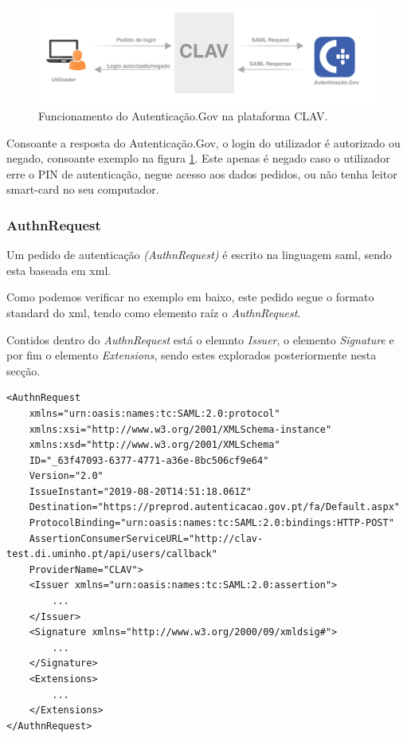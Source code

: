 \vspace{-3mm}
\begin{figure}[h]
    \centering
    \includegraphics[width=\textwidth]{img/saml/clavflow.png}
    \caption{Funcionamento do Autenticação.Gov na plataforma CLAV.}
    \label{clavflow}
\end{figure}

Consoante a resposta do Autenticação.Gov, o login do utilizador é autorizado ou negado, consoante exemplo na figura \ref{clavflow}.
Este apenas é negado caso o utilizador erre o PIN de autenticação, negue acesso aos dados pedidos, ou não tenha leitor smart-card no seu computador.

\cleardoublepage
\subsubsection{AuthnRequest} \label{authnRequestSection}

Um pedido de autenticação \emph{(AuthnRequest)} é escrito na linguagem \gls{saml}, sendo esta baseada em \gls{xml}.

Como podemos verificar no exemplo em baixo, este pedido segue o formato standard do \gls{xml}, tendo como elemento raíz o \emph{AuthnRequest}.

Contidos dentro do \emph{AuthnRequest} está o elemnto \emph{Issuer}, o elemento \emph{Signature} e por fim o elemento \emph{Extensions}, sendo estes explorados posteriormente nesta secção.

\begin{lstlisting}
<AuthnRequest 
    xmlns="urn:oasis:names:tc:SAML:2.0:protocol"
    xmlns:xsi="http://www.w3.org/2001/XMLSchema-instance"
    xmlns:xsd="http://www.w3.org/2001/XMLSchema"
    ID="_63f47093-6377-4771-a36e-8bc506cf9e64"
    Version="2.0"
    IssueInstant="2019-08-20T14:51:18.061Z"
    Destination="https://preprod.autenticacao.gov.pt/fa/Default.aspx"
    ProtocolBinding="urn:oasis:names:tc:SAML:2.0:bindings:HTTP-POST"
    AssertionConsumerServiceURL="http://clav-test.di.uminho.pt/api/users/callback"
    ProviderName="CLAV">
    <Issuer xmlns="urn:oasis:names:tc:SAML:2.0:assertion">
        ...
    </Issuer>
    <Signature xmlns="http://www.w3.org/2000/09/xmldsig#">
        ...
    </Signature>
    <Extensions>
        ...
    </Extensions>
</AuthnRequest>
\end{lstlisting}

